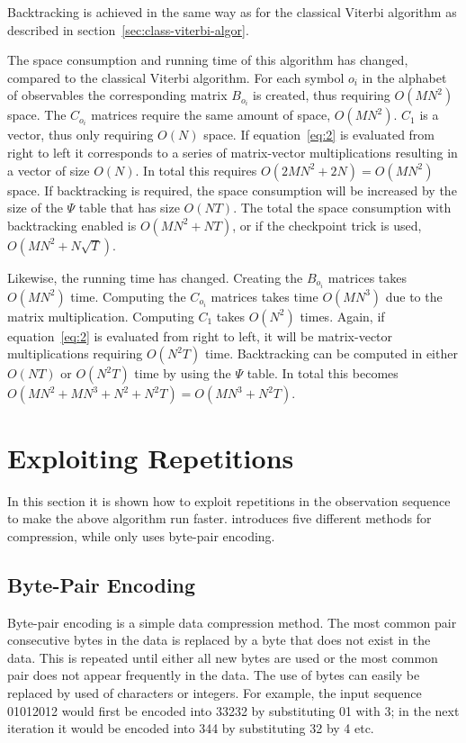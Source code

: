 Backtracking is achieved in the same way as for the classical Viterbi algorithm
as described in section~\ref{sec:class-viterbi-algor}.

The space consumption and running time of this algorithm has changed, compared
to the classical Viterbi algorithm. For each symbol $o_i$ in the alphabet of
observables the corresponding matrix $B_{o_i}$ is created, thus requiring
$O(M N^2)$ space. The $C_{o_i}$ matrices require the same amount of space,
$O(M N^2)$. $C_1$ is a vector, thus only requiring $O(N)$ space. If
equation~\eqref{eq:2} is evaluated from right to left it corresponds to a
series of matrix-vector multiplications resulting in a vector of size $O(N)$.
In total this requires $O(2 M N^2 + 2 N) = O(M N^2)$ space. If backtracking is
required, the space consumption will be increased by the size of the $\Psi$
table that has size $O(N T)$. The total the space consumption with backtracking
enabled is $O(M N^2 + N T)$, or if the checkpoint trick is used, $O(M N^2 +
N \sqrt{T})$.

Likewise, the running time has changed. Creating the $B_{o_i}$ matrices takes
$O(M N^2)$ time. Computing the $C_{o_i}$ matrices takes time $O(M N^3)$ due to
the matrix multiplication. Computing $C_1$ takes $O(N^2)$ times. Again, if
equation~\eqref{eq:2} is evaluated from right to left, it will be matrix-vector
multiplications requiring $O(N^2 T)$ time. Backtracking can be computed in either
$O(NT)$ or $O(N^2 T)$ time by using the $\Psi$ table. In total this becomes
$O(M N^2 + M N^3 + N^2 + N^2 T) = O(M N^3 + N^2 T)$.

\section{Exploiting Repetitions}
\label{sec:expl-repet}

In this section it is shown how to exploit repetitions in the observation sequence
to make the above algorithm run faster. \citet{lifshits2009speeding} introduces
five different methods for compression, while \citet{sand2013ziphmmlib} only uses
byte-pair encoding.

\subsection{Byte-Pair Encoding}

Byte-pair encoding is a simple data compression method. The most common pair
consecutive bytes in the data is replaced by a byte that does not exist in the
data. This is repeated until either all new bytes are used or the most common
pair does not appear frequently in the data. The use of bytes can easily be
replaced by used of characters or integers. For example, the input sequence
01012012 would first be encoded into 33232 by substituting 01 with 3; in the
next iteration it would be encoded into 344 by substituting 32 by 4 etc.

